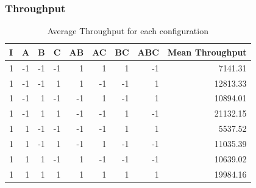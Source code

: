 \documentclass[11pt,a4paper]{article}
\begin{document}
\subsubsection{Throughput} 
\begin{table}[H]
	\caption{Average Throughput for each configuration}
	\centering
	\begin{tabular}{|r|r|r|r|r|r|r|r|r|}
		\hline
		\multicolumn{1}{|l|}{I} & \multicolumn{1}{l|}{A} & \multicolumn{1}{l|}{B} & \multicolumn{1}{l|}{C} & \multicolumn{1}{l|}{AB} & \multicolumn{1}{l|}{AC} & \multicolumn{1}{l|}{BC} & \multicolumn{1}{l|}{ABC} & \multicolumn{1}{l|}{Mean Throughput} \\ \hline
		1 & -1 & -1 & -1 & 1 & 1 & 1 & -1 & 7141.31 \\ \hline
		1 & -1 & -1 & 1 & 1 & -1 & -1 & 1 & 12813.33 \\ \hline
		1 & -1 & 1 & -1 & -1 & 1 & -1 & 1 & 10894.01 \\ \hline
		1 & -1 & 1 & 1 & -1 & -1 & 1 & -1 & 21132.15 \\ \hline
		1 & 1 & -1 & -1 & -1 & -1 & 1 & 1 & 5537.52 \\ \hline
		1 & 1 & -1 & 1 & -1 & 1 & -1 & -1 & 11035.39 \\ \hline
		1 & 1 & 1 & -1 & 1 & -1 & -1 & -1 & 10639.02 \\ \hline
		1 & 1 & 1 & 1 & 1 & 1 & 1 & 1 & 19984.16 \\ \hline
	\end{tabular}
	\label{}
\end{table}
\end{document}

